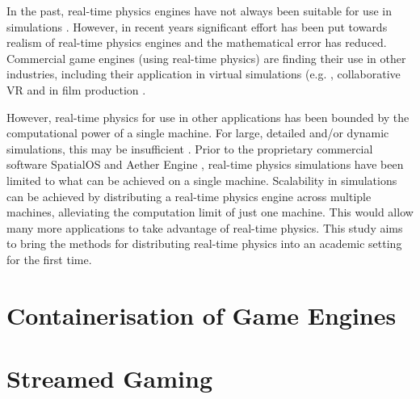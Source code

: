 In the past, real-time physics engines have not always been suitable for use in simulations \cite{Boeing2007}. However, in recent years significant effort has been put towards realism of real-time physics engines and the mathematical error has reduced. Commercial game engines (using real-time physics) are finding their use in other industries, including their application in virtual simulations (e.g. \cite{Xu2017, Lu2017, Shah2018}, collaborative VR \cite{NVIDIAHolodeck} and in film production \cite{mehta2015animated}.


However, real-time physics for use in other applications has been bounded by the computational power of a single machine. For large, detailed and/or dynamic simulations, this may be insufficient \cite{koszela2018distributed}. Prior to the proprietary commercial software SpatialOS \cite{SpatialOS} and Aether Engine \cite{AetherEngine}, real-time physics simulations have been limited to what can be achieved on a single machine. Scalability in simulations can be achieved by distributing a real-time physics engine across multiple machines, alleviating the computation limit of just one machine. This would allow many more applications to take advantage of real-time physics. This study aims to bring the methods for distributing real-time physics into an academic setting for the first time.

\section{Containerisation of Game Engines}

\section{Streamed Gaming}

